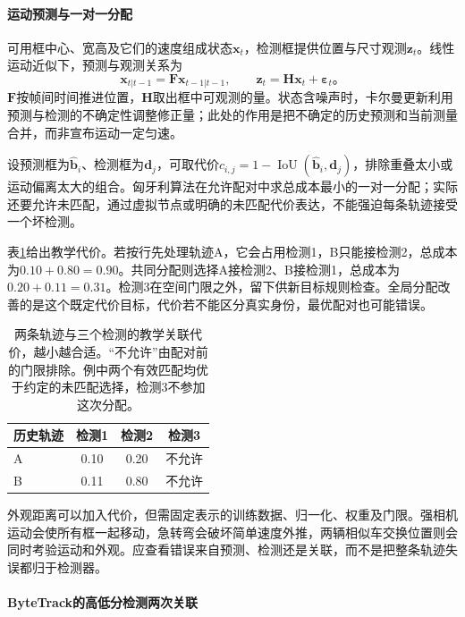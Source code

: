 \paragraph{运动预测与一对一分配}
\label{sec:vision-video-motion-assignment}

可用框中心、宽高及它们的速度组成状态$\bm{x}_t$，检测框提供位置与尺寸观测$\bm{z}_t$。线性运动近似下，预测与观测关系为
\[
  \bm{x}_{t|t-1}=\bm{F}\bm{x}_{t-1|t-1},
  \qquad
  \bm{z}_t=\bm{H}\bm{x}_t+\bm{\varepsilon}_t\text{。}
\]
$\bm{F}$按帧间时间推进位置，$\bm{H}$取出框中可观测的量。状态含噪声时，卡尔曼更新利用预测与检测的不确定性调整修正量；此处的作用是把不确定的历史预测和当前测量合并，而非宣布运动一定匀速。

设预测框为$\widehat{\bm{b}}_i$、检测框为$\bm{d}_j$，可取代价$c_{i,j}=1-\operatorname{IoU}(\widehat{\bm{b}}_i,\bm{d}_j)$，排除重叠太小或运动偏离太大的组合。匈牙利算法在允许配对中求总成本最小的一对一分配；实际还要允许未匹配，通过虚拟节点或明确的未匹配代价表达，不能强迫每条轨迹接受一个坏检测。

表\ref{tab:vision-association-cost}给出教学代价。若按行先处理轨迹A，它会占用检测1，B只能接检测2，总成本为$0.10+0.80=0.90$。共同分配则选择A接检测2、B接检测1，总成本为$0.20+0.11=0.31$。检测3在空间门限之外，留下供新目标规则检查。全局分配改善的是这个既定代价目标，代价若不能区分真实身份，最优配对也可能错误。
\begin{table}[htbp]
  \centering
  \begin{tabular}{lccc}
    \toprule
    历史轨迹 & 检测1 & 检测2 & 检测3\\
    \midrule
    A & 0.10 & 0.20 & 不允许\\
    B & 0.11 & 0.80 & 不允许\\
    \bottomrule
  \end{tabular}
  \caption{两条轨迹与三个检测的教学关联代价，越小越合适。“不允许”由配对前的门限排除。例中两个有效匹配均优于约定的未匹配选择，检测3不参加这次分配。}
  \label{tab:vision-association-cost}
\end{table}

外观距离可以加入代价，但需固定表示的训练数据、归一化、权重及门限。强相机运动会使所有框一起移动，急转弯会破坏简单速度外推，两辆相似车交换位置则会同时考验运动和外观。应查看错误来自预测、检测还是关联，而不是把整条轨迹失误都归于检测器。

\paragraph{ByteTrack的高低分检测两次关联}
\label{sec:vision-video-bytetrack}


